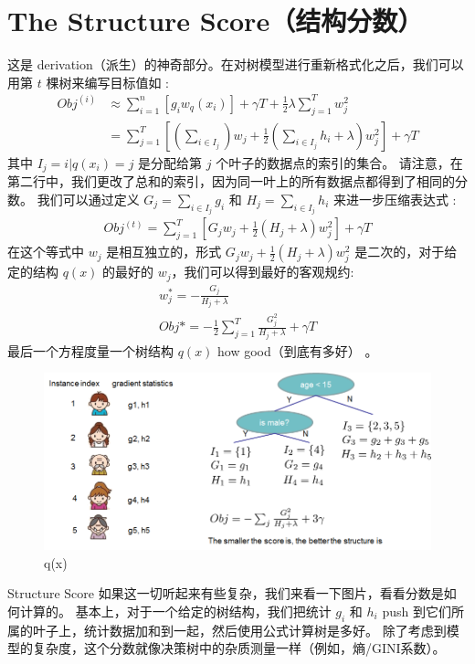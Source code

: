\documentclass{article}
\begin{document}
\section{The Structure Score（结构分数）}
这是 derivation（派生）的神奇部分。在对树模型进行重新格式化之后，我们可以用第 $t$ 棵树来编写目标值如 :
\begin{equation*}
	\begin{split}
		Obj^{(i)}&\approx\sum_{i=1}^n[g_iw_q(x_i)]+\gamma T+\frac{1}{2}\lambda\sum_{j=1}^Tw_j^2\\
		&=\sum_{j=1}^T[(\sum_{i\in I_j})w_j+\frac{1}{2}(\sum_{i\in I_j}h_i+\lambda)w^2_j]+\gamma T
	\end{split}
\end{equation*}
其中 $I_j={i|q(x_i)=j}$ 是分配给第 $j$ 个叶子的数据点的索引的集合。 请注意，在第二行中，我们更改了总和的索引，因为同一叶上的所有数据点都得到了相同的分数。 我们可以通过定义 $G_j=\sum_{i\in I_j}g_i$ 和 $H_j=\sum_{i\in I_j}h_i$ 来进一步压缩表达式 :
\begin{equation*}
	\begin{split}
		Obj^{(t)}=\sum_{j=1}^T[G_jw_j+\frac{1}{2}(H_j+\lambda)w_j^2]+\gamma T
	\end{split}
\end{equation*}
在这个等式中 $w_j$ 是相互独立的，形式 $G_jw_j+\frac{1}{2}(H_j+\lambda)w_j^2$ 是二次的，对于给定的结构 $q(x)$ 的最好的 $w_j$，我们可以得到最好的客观规约:
\begin{equation*}
	\begin{split}
		w_j^*=-\frac{G_j}{H_j+\lambda}\\
		Obj*=-\frac{1}{2}\sum_{j=1}^T\frac{G_j^2}{H_j+\lambda}+\gamma T
	\end{split}
\end{equation*}
最后一个方程度量一个树结构 $q(x)$ how good（到底有多好） 。
\begin{figure}[H]
	\centering
	\includegraphics[scale=0.5]{struct_score.png}
	\caption{q(x)}
\end{figure}
Structure Score
如果这一切听起来有些复杂，我们来看一下图片，看看分数是如何计算的。 基本上，对于一个给定的树结构，我们把统计 $g_i$ 和 $h_i$ push 到它们所属的叶子上，统计数据加和到一起，然后使用公式计算树是多好。 除了考虑到模型的复杂度，这个分数就像决策树中的杂质测量一样（例如，熵/GINI系数）。
\end{document}
